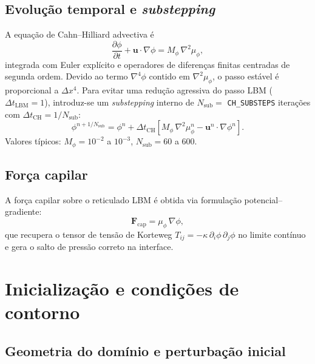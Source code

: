 \documentclass[11pt,a4paper]{article}
\begin{document}
\subsection{Evolução temporal e \textit{substepping}}

A equação de Cahn--Hilliard advectiva é
\begin{equation}
    \frac{\partial\phi}{\partial t} + \mathbf{u}\!\cdot\!\nabla\phi
    = M_\phi\,\nabla^2\mu_\phi,
    \label{eq:CH}
\end{equation}
integrada com Euler explícito e operadores de diferenças finitas centradas
de segunda ordem. Devido ao termo $\nabla^4\phi$ contido em $\nabla^2\mu_\phi$,
o passo estável é proporcional a $\Delta x^4$. Para evitar uma redução
agressiva do passo LBM ($\Delta t_{\mathrm{LBM}} = 1$), introduz-se um
\textit{substepping} interno de $N_{\mathrm{sub}} =$ \texttt{CH\_SUBSTEPS}
iterações com $\Delta t_{\mathrm{CH}} = 1/N_{\mathrm{sub}}$:
\begin{equation}
    \phi^{n+1/N_{\mathrm{sub}}} = \phi^n
    + \Delta t_{\mathrm{CH}}
    \left[ M_\phi\,\nabla^2\mu_\phi^n - \mathbf{u}^n\!\cdot\!\nabla\phi^n \right].
\end{equation}
Valores típicos: $M_\phi = 10^{-2}$ a $10^{-3}$,
$N_{\mathrm{sub}} = 60$ a $600$.

\subsection{Força capilar}

A força capilar sobre o reticulado LBM é obtida via formulação
potencial--gradiente:
\begin{equation}
    \mathbf{F}_{\mathrm{cap}} = \mu_\phi\,\nabla\phi,
\end{equation}
que recupera o tensor de tensão de Korteweg
$T_{ij} = -\kappa\,\partial_i\phi\,\partial_j\phi$ no limite contínuo e
gera o salto de pressão correto na interface.

\section{Inicialização e condições de contorno}

\subsection{Geometria do domínio e perturbação inicial}
\end{document}
